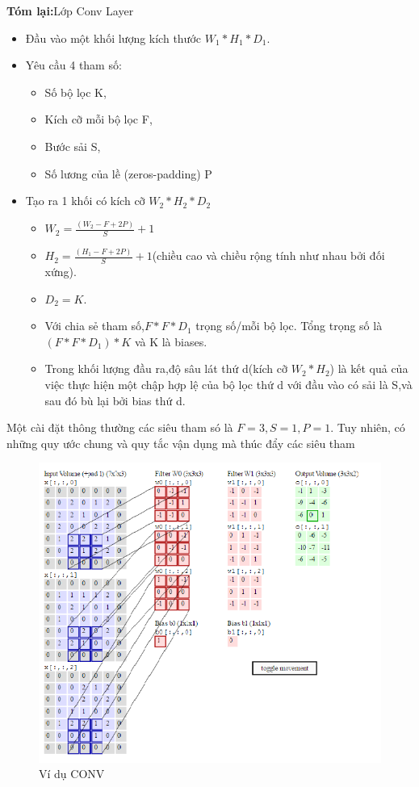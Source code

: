 \documentclass[a4paper,12pt]{report}
\begin{document}
\textbf{Tóm lại:}Lớp Conv Layer
\begin{itemize}
\item Đầu vào một khối lượng kích thước $W_1*H_1*D_1$.
\item Yêu cầu 4 tham số:
\begin{itemize}
\item Số bộ lọc K,
\item Kích cỡ mỗi bộ lọc F,
\item Bước sải S,
\item Số lương của lề (zeros-padding) P
\end{itemize}
\item Tạo ra 1 khối có kích cỡ $W_2*H_2*D_2$
\begin{itemize}
\item $W_2= \frac{(W_2 - F + 2P)}{S} + 1$
\item $H_2=\frac{(H_1 - F + 2P)}{S}+1$(chiều cao và chiều rộng tính như nhau bởi đối xứng).
\item $D_2 = K$.
\item Với chia sẻ tham số,$F*F*D_1$ trọng số/mỗi bộ lọc. Tổng trọng số là $(F*F*D_1)*K$ và K là biases.
\item Trong khối lượng đầu ra,độ sâu lát thứ d(kích cỡ $W_2*H_2$) là kết quả của việc thực hiện một chập hợp lệ của bộ lọc thứ d với đầu vào có sải là S,và sau đó bù lại bởi bias thứ d.
\end{itemize}
\end{itemize}
Một cài đặt thông thường các siêu tham só là $F = 3, S = 1, P= 1 $. Tuy nhiên, có những quy ước chung và quy tắc vận dụng mà thúc đẩy các siêu tham
\begin{center}
\begin{figure}[H]
\includegraphics[scale=0.7]{img3.png}
\caption{Ví dụ CONV}
\end{figure}
\end{center}
\end{document}
